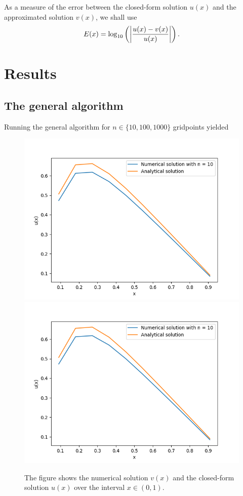 \documentclass[english,notitlepage]{revtex4-1}  %
\begin{document}
As a measure of the error between the closed-form solution $u(x)$ and the approximated solution $v(x)$, we shall use 
\begin{equation}
	E(x) = \log_{10}\left(\abs{\frac{u(x)-v(x)}{u(x)}}\right).
\end{equation}

\section{Results}
\subsection{The general algorithm}
Running the general algorithm for $n \in \{10, 100, 1000\}$ gridpoints yielded 
\begin{figure}[h!]
	\includegraphics{solution_part_b_n_10_general.png}
	\includegraphics{solution_part_b_n_10_general.png}
	\caption{The figure shows the numerical solution $v(x)$ and the closed-form solution $u(x)$ over the interval $x\in(0,1)$.}
\end{figure}
\end{document}
